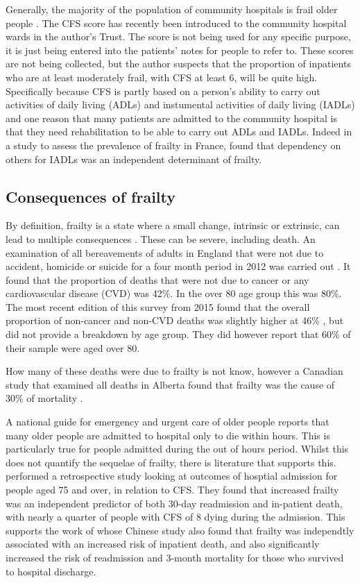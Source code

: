\documentclass
[
	12pt,
	a4paper,
	oneside,
]{article}
\begin{document}
Generally, the majority of the population of community hospitals is frail older 
people \parencite{silver:12}.
The CFS score has recently been introduced to the community hospital wards in the author's Trust. The
score is not being used for any specific purpose, it is just being entered into 
the patients' notes for people to refer to. These scores are not being collected, 
but the author suspects that the proportion of inpatients who are at least 
moderately frail, with CFS at least 6, will be quite high. Specifically because
CFS is partly based on a person's ability to carry out activities of daily living (ADLs)
and instumental activities of daily living (IADLs) and one reason that many patients
are admitted to the community hospital is that they need rehabilitation to be
able to carry out ADLs and IADLs. Indeed in a study to assess the prevalence of frailty
in France, \textcite{cossec:16} found that dependency on others for IADLs was an 
independent determinant of frailty.

\subsection{Consequences of frailty}

By definition, frailty is a state where a small change, intrinsic or extrinsic, can
lead to multiple consequences \parencite{collard:12}. These can be severe, including 
death. An examination
of all bereavements of adults in England that were not due to accident, homicide or suicide for 
a four month period in 2012 was 
carried out \parencite{ons:13}. It found that the proportion of deaths
that were not due to cancer or any cardiovascular disease (CVD) was 42\%. In the over 80
age group this was 80\%. The most recent edition of this survey from 2015 found
that the overall proportion of non-cancer and non-CVD deaths was slightly higher 
at 46\% \parencite{ons:16}, but did not provide a breakdown by age group. They 
did however report that 60\% of their sample were aged over 80.

How many of these deaths were due to frailty is not know, however 
a Canadian study that examined all deaths in Alberta found that frailty was the
cause of 30\% of mortality \parencite{fassbender:09}.

A national guide for emergency and urgent care of older people \parencite{silver:12}
reports that many older people are admitted to hospital only to die within hours.
This is particularly true for people admitted during the out of hours period.
Whilst this does not quantify the sequelae of frailty, there is literature that 
supports this. \textcite{wallis:15} performed a retrospective study looking 
at outcomes of hosptial admission for people aged 75 and over, in relation to CFS. 
They found that increased frailty was an independent predictor of both 30-day
readmission and in-patient death, with nearly a quarter of people with CFS of 8 dying 
during the admission. This supports the work of \textcite{kang:15} whose Chinese 
study also found that frailty was independtly associated with an increased risk of 
inpatient death, and also significantly increased the risk of readmission and 
3-month mortality for those who survived to hospital discharge.
\end{document}

